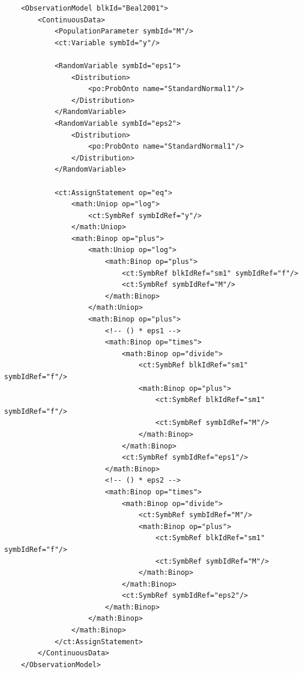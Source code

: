 \lstset{language=XML}
\begin{lstlisting}
    <ObservationModel blkId="Beal2001">
        <ContinuousData>
            <PopulationParameter symbId="M"/>
            <ct:Variable symbId="y"/>
            
            <RandomVariable symbId="eps1">
                <Distribution>
                    <po:ProbOnto name="StandardNormal1"/>
                </Distribution>
            </RandomVariable>
            <RandomVariable symbId="eps2">
                <Distribution>
                    <po:ProbOnto name="StandardNormal1"/>
                </Distribution>
            </RandomVariable>
            
            <ct:AssignStatement op="eq">
                <math:Uniop op="log">
                    <ct:SymbRef symbIdRef="y"/>
                </math:Uniop>
                <math:Binop op="plus">
                    <math:Uniop op="log">
                        <math:Binop op="plus">
                            <ct:SymbRef blkIdRef="sm1" symbIdRef="f"/>
                            <ct:SymbRef symbIdRef="M"/>
                        </math:Binop>
                    </math:Uniop>
                    <math:Binop op="plus">
                        <!-- () * eps1 -->
                        <math:Binop op="times">
                            <math:Binop op="divide">
                                <ct:SymbRef blkIdRef="sm1" symbIdRef="f"/>
                                <math:Binop op="plus">
                                    <ct:SymbRef blkIdRef="sm1" symbIdRef="f"/>
                                    <ct:SymbRef symbIdRef="M"/>
                                </math:Binop>
                            </math:Binop>
                            <ct:SymbRef symbIdRef="eps1"/>
                        </math:Binop>
                        <!-- () * eps2 -->
                        <math:Binop op="times">
                            <math:Binop op="divide">
                                <ct:SymbRef symbIdRef="M"/>
                                <math:Binop op="plus">
                                    <ct:SymbRef blkIdRef="sm1" symbIdRef="f"/>
                                    <ct:SymbRef symbIdRef="M"/>
                                </math:Binop>
                            </math:Binop>
                            <ct:SymbRef symbIdRef="eps2"/>
                        </math:Binop>
                    </math:Binop>
                </math:Binop>
            </ct:AssignStatement>
        </ContinuousData>
    </ObservationModel>
\end{lstlisting}

